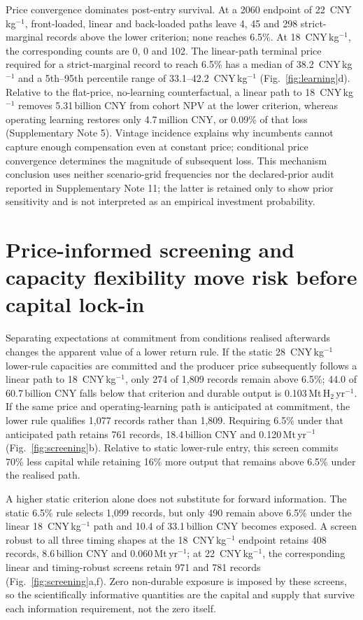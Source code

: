 \documentclass[11pt,a4paper]{article}
\newcommand{\cnykg}{CNY\,kg$^{-1}$}
\begin{document}
Price convergence dominates post-entry survival. At a 2060 endpoint of 22~\cnykg{}, front-loaded, linear and back-loaded paths leave 4, 45 and 298 strict-marginal records above the lower criterion; none reaches 6.5\%. At 18~\cnykg{}, the corresponding counts are 0, 0 and 102. The linear-path terminal price required for a strict-marginal record to reach 6.5\% has a median of 38.2~\cnykg{} and a 5th--95th percentile range of 33.1--42.2~\cnykg{} (Fig.~\ref{fig:learning}d). Relative to the flat-price, no-learning counterfactual, a linear path to 18~\cnykg{} removes 5.31\,billion CNY from cohort NPV at the lower criterion, whereas operating learning restores only 4.7\,million CNY, or 0.09\% of that loss (Supplementary Note 5). Vintage incidence explains why incumbents cannot capture enough compensation even at constant price; conditional price convergence determines the magnitude of subsequent loss. This mechanism conclusion uses neither scenario-grid frequencies nor the declared-prior audit reported in Supplementary Note 11; the latter is retained only to show prior sensitivity and is not interpreted as an empirical investment probability.

\section*{Price-informed screening and capacity flexibility move risk before capital lock-in}

Separating expectations at commitment from conditions realised afterwards changes the apparent value of a lower return rule. If the static 28~\cnykg{} lower-rule capacities are committed and the producer price subsequently follows a linear path to 18~\cnykg{}, only 274 of 1,809 records remain above 6.5\%; 44.0 of 60.7\,billion CNY falls below that criterion and durable output is 0.103\,Mt\,H$_2$\,yr$^{-1}$. If the same price and operating-learning path is anticipated at commitment, the lower rule qualifies 1,077 records rather than 1,809. Requiring 6.5\% under that anticipated path retains 761 records, 18.4\,billion CNY and 0.120\,Mt\,yr$^{-1}$ (Fig.~\ref{fig:screening}b). Relative to static lower-rule entry, this screen commits 70\% less capital while retaining 16\% more output that remains above 6.5\% under the realised path.

A higher static criterion alone does not substitute for forward information. The static 6.5\% rule selects 1,099 records, but only 490 remain above 6.5\% under the linear 18~\cnykg{} path and 10.4 of 33.1\,billion CNY becomes exposed. A screen robust to all three timing shapes at the 18~\cnykg{} endpoint retains 408 records, 8.6\,billion CNY and 0.060\,Mt\,yr$^{-1}$; at 22~\cnykg{}, the corresponding linear and timing-robust screens retain 971 and 781 records (Fig.~\ref{fig:screening}a,f). Zero non-durable exposure is imposed by these screens, so the scientifically informative quantities are the capital and supply that survive each information requirement, not the zero itself.
\end{document}
